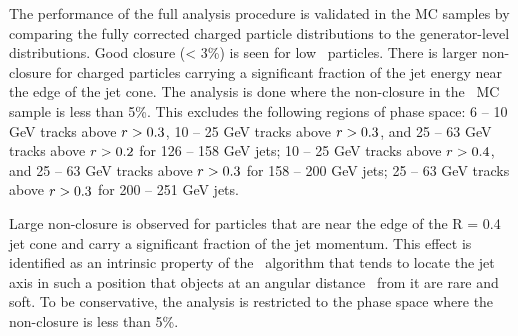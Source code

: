
The performance of the full analysis procedure is validated in the MC samples by comparing the fully corrected charged particle distributions to the generator-level distributions. Good closure (< 3\%) is seen for low \pt\ particles. There is larger non-closure for charged particles carrying a significant fraction of the jet energy near the edge of the jet cone. The analysis is done where the non-closure in the \pp\ MC sample is less than 5\%.  This excludes the following regions of phase space: 6 -- 10 GeV tracks above $\mbox{$r$} > 0.3$, 10 -- 25 GeV tracks above $\mbox{$r$} > 0.3$, and 25 -- 63 GeV tracks above $\mbox{$r$} > 0.2$ for 126 -- 158 GeV jets; 10 -- 25 GeV tracks above $\mbox{$r$} > 0.4$, and 25 -- 63 GeV tracks above $\mbox{$r$} > 0.3$ for 158 -- 200 GeV jets; 25 -- 63 GeV tracks above $\mbox{$r$} > 0.3$ for 200 -- 251 GeV jets.


Large non-closure is observed for particles that are near the edge of the R = 0.4 jet cone and carry a significant fraction of the jet momentum. This effect is identified as an intrinsic property of the \antikt\ algorithm that tends to locate the jet axis in such a position that objects at an angular distance \rvar\ from it are rare and soft. To be conservative, the analysis is restricted to the phase space where the non-closure is less than 5\%.

